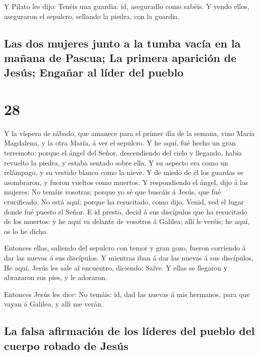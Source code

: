  Y Pilato les dijo: Tenéis una guardia: id, aseguradlo
como sabéis.  Y yendo ellos, aseguraron el sepulcro,
sellando la piedra, con la guardia.

\hypertarget{las-dos-mujeres-junto-a-la-tumba-vacuxeda-en-la-mauxf1ana-de-pascua-la-primera-apariciuxf3n-de-jesuxfas-engauxf1ar-al-luxedder-del-pueblo}{%
\subsection{Las dos mujeres junto a la tumba vacía en la mañana de
Pascua; La primera aparición de Jesús; Engañar al líder del
pueblo}\label{las-dos-mujeres-junto-a-la-tumba-vacuxeda-en-la-mauxf1ana-de-pascua-la-primera-apariciuxf3n-de-jesuxfas-engauxf1ar-al-luxedder-del-pueblo}}

\hypertarget{section-40-28}{%
\section{28}\label{section-40-28}}

 Y la víspera de sábado, que amanece para el primer día de
la semana, vino María Magdalena, y la otra María, á ver el sepulcro.
 Y he aquí, fué hecho un gran terremoto: porque el ángel
del Señor, descendiendo del cielo y llegando, había revuelto la piedra,
y estaba sentado sobre ella.  Y su aspecto era como un
relámpago, y su vestido blanco como la nieve.  Y de miedo
de él los guardas se asombraron, y fueron vueltos como muertos.
 Y respondiendo el ángel, dijo á las mujeres: No temáis
vosotras; porque yo sé que buscáis á Jesús, que fué crucificado.
 No está aquí; porque ha resucitado, como dijo. Venid, ved
el lugar donde fué puesto el Señor.  E id presto, decid á
sus discípulos que ha resucitado de los muertos: y he aquí va delante de
vosotros á Galilea; allí le veréis; he aquí, os lo he dicho.

 Entonces ellas, saliendo del sepulcro con temor y gran
gozo, fueron corriendo á dar las nuevas á sus discípulos. Y mientras
iban á dar las nuevas á sus discípulos,  He aquí, Jesús
les sale al encuentro, diciendo: Salve. Y ellas se llegaron y abrazaron
sus pies, y le adoraron.

 Entonces Jesús les dice: No temáis: id, dad las nuevas á
mis hermanos, para que vayan á Galilea, y allí me verán.

\hypertarget{la-falsa-afirmaciuxf3n-de-los-luxedderes-del-pueblo-del-cuerpo-robado-de-jesuxfas}{%
\subsection{La falsa afirmación de los líderes del pueblo del cuerpo
robado de
Jesús}\label{la-falsa-afirmaciuxf3n-de-los-luxedderes-del-pueblo-del-cuerpo-robado-de-jesuxfas}}

